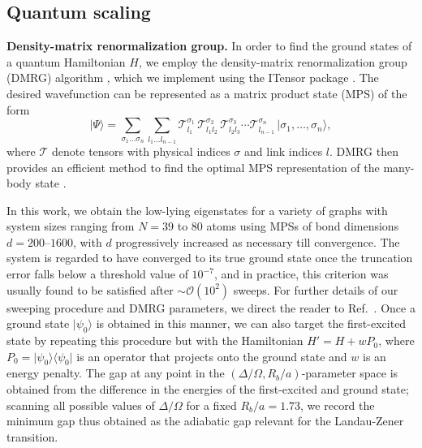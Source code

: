 \documentclass[twocolumn,amssymb,secnumarabic, prl, aps, nofootinbib]{revtex4-1}
\newcommand{\mc}{\mathcal}
\begin{document}
\subsection{Quantum scaling}

\noindent \textbf{Density-matrix renormalization group.}
In order to find the ground states of a quantum Hamiltonian $H$, we employ the density-matrix renormalization group (DMRG) algorithm \cite{white_density_1992, white_density-matrix_1993}, which we implement using the ITensor package \cite{itensor}. The desired wavefunction can be represented as a matrix product state (MPS) \cite{mcculloch2007density, verstraete2008matrix} of the form
\begin{equation}
	\vert \Psi \rangle = \sum_{\sigma_1\ldots\sigma_n} \sum_{l_1\ldots l_{n-1}} \mc{T}_{l_1}^{\sigma_1}\,\mc{T}_{l_1l_2}^{\sigma_2}\,\mc{T}_{l_2l_3}^{\sigma_3}\cdots \mc{T}_{l_{n-1}}^{\sigma_n}\, \vert \sigma_1,\ldots,\sigma_n \rangle,
\end{equation}
where $\mc{T}$ denote tensors with physical indices $\sigma$ and link indices $l$. DMRG then provides an efficient method to find the optimal MPS representation of the many-body state \cite{schollwock_density-matrix_2011-1}. 


In this work, we obtain the low-lying eigenstates for a variety of graphs with system sizes ranging from $N=39$ to $80$ atoms using MPSs of bond dimensions $d = 200$--$1600$, with $d$ progressively increased as necessary till convergence. The system is regarded to have converged to its true ground state once the truncation error falls below a threshold value of $10^{-7}$, and in practice, this criterion was usually found to be satisfied after $\sim \mathcal{O}(10^2)$ sweeps. For further details of our sweeping procedure and DMRG parameters, we direct the reader to Ref.~\cite{samajdar_complex_2020}. Once a ground state $\rvert \psi_0 \rangle$ is obtained in this manner, we can also target the first-excited state by repeating this procedure but with the Hamiltonian $H' = H + w P_0$, where $P_0 = \rvert \psi_0 \rangle \langle \psi_0 \lvert$ is an operator that projects onto the ground state and $w$ is an energy penalty. The gap at any point in the $(\Delta/\Omega, R_b/a)$-parameter space is obtained from the difference in the energies of the first-excited and ground state; scanning all possible values of $\Delta/\Omega$ for a fixed $R_b/a=1.73$, we record the minimum gap thus obtained as the adiabatic gap relevant for the Landau-Zener transition.\\
\end{document}
